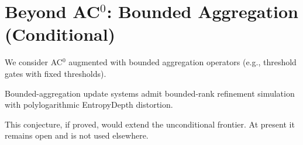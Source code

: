 \section{Beyond AC$^0$: Bounded Aggregation (Conditional)}

We consider AC$^0$ augmented with bounded aggregation operators
(e.g., threshold gates with fixed thresholds).

\begin{conjecture}
Bounded-aggregation update systems admit bounded-rank refinement
simulation with polylogarithmic EntropyDepth distortion.
\end{conjecture}

This conjecture, if proved, would extend the unconditional frontier.
At present it remains open and is not used elsewhere.

